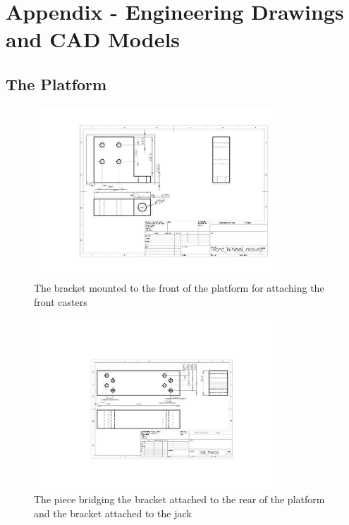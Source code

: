 \chapter{Appendix - Engineering Drawings and CAD Models}

\section{The Platform}

\begin{figure}
\centering
 \includegraphics[width=0.8\textwidth]{images/Front_Wheel_mount}
\caption{The bracket mounted to the front of the platform for attaching the front casters}
\label{fig:front_bracket}
\end{figure}

\begin{figure}
\centering
 \includegraphics[width=0.8\textwidth]{images/Tall_Piece}
\caption{The piece bridging the bracket attached to the rear of the platform and the bracket attached to the jack}
\label{fig:tall_piece}
\end{figure}

